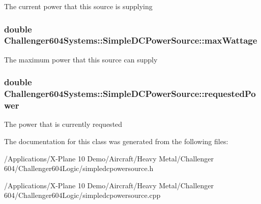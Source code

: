 The current power that this source is supplying \hypertarget{class_challenger604_systems_1_1_simple_d_c_power_source_a7ccc3391b03c04b09f6792e0a44b026b}{
\subsubsection[{max\-Wattage}]{\setlength{\rightskip}{0pt plus 5cm}double Challenger604\-Systems\-::\-Simple\-D\-C\-Power\-Source\-::max\-Wattage\hspace{0.3cm}{\ttfamily [protected]}}}\label{class_challenger604_systems_1_1_simple_d_c_power_source_a7ccc3391b03c04b09f6792e0a44b026b}
The maximum power that this source can supply \hypertarget{class_challenger604_systems_1_1_simple_d_c_power_source_a37f983774689318c3cb0295380ce4bd7}{
\subsubsection[{requested\-Power}]{\setlength{\rightskip}{0pt plus 5cm}double Challenger604\-Systems\-::\-Simple\-D\-C\-Power\-Source\-::requested\-Power\hspace{0.3cm}{\ttfamily [protected]}}}\label{class_challenger604_systems_1_1_simple_d_c_power_source_a37f983774689318c3cb0295380ce4bd7}
The power that is currently requested 

The documentation for this class was generated from the following files\-:\begin{DoxyCompactItemize}
\item 
/\-Applications/\-X-\/\-Plane 10 Demo/\-Aircraft/\-Heavy Metal/\-Challenger 604/\-Challenger604\-Logic/simpledcpowersource.\-h\item 
/\-Applications/\-X-\/\-Plane 10 Demo/\-Aircraft/\-Heavy Metal/\-Challenger 604/\-Challenger604\-Logic/simpledcpowersource.\-cpp\end{DoxyCompactItemize}

